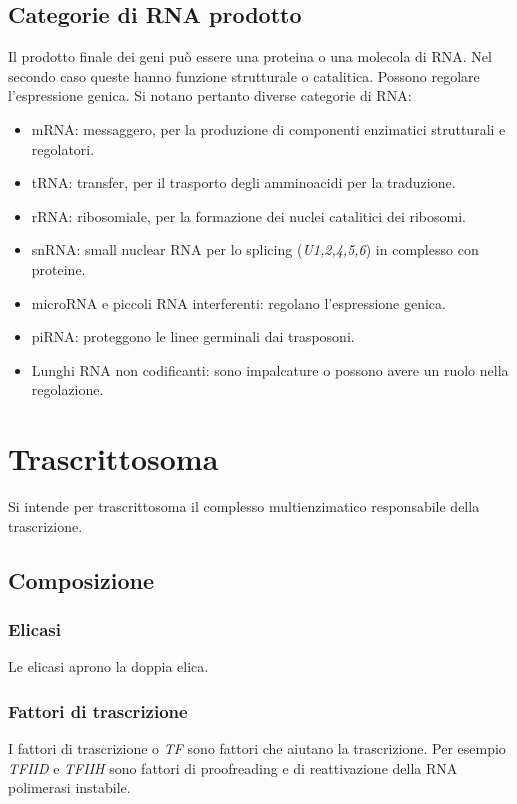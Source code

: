 	\subsection{Categorie di RNA prodotto}
	Il prodotto finale dei geni pu\`o essere una proteina o una molecola di RNA.
	Nel secondo caso queste hanno funzione strutturale o catalitica.
	Possono regolare l'espressione genica.
	Si notano pertanto diverse categorie di RNA:
	\begin{multicols}{2}
		\begin{itemize}
			\item mRNA: messaggero, per la produzione di componenti enzimatici strutturali e regolatori.
			\item tRNA: transfer, per il trasporto degli amminoacidi per la traduzione.
			\item rRNA: ribosomiale, per la formazione dei nuclei catalitici dei ribosomi.
			\item snRNA: small nuclear RNA per lo splicing (\emph{U1,2,4,5,6}) in complesso con proteine.
			\item microRNA e piccoli RNA interferenti: regolano l'espressione genica.
			\item piRNA: proteggono le linee germinali dai trasposoni.
			\item Lunghi RNA non codificanti: sono impalcature o possono avere un ruolo nella regolazione.
		\end{itemize}
	\end{multicols}
\section{Trascrittosoma}
Si intende per trascrittosoma il complesso multienzimatico responsabile della trascrizione.

	\subsection{Composizione}

		\subsubsection{Elicasi}
		Le elicasi aprono la doppia elica.

		\subsubsection{Fattori di trascrizione}
		I fattori di trascrizione o \emph{TF} sono fattori che aiutano la trascrizione.
		Per esempio \emph{TFIID} e \emph{TFIIH} sono fattori di proofreading e di reattivazione della RNA polimerasi instabile.

